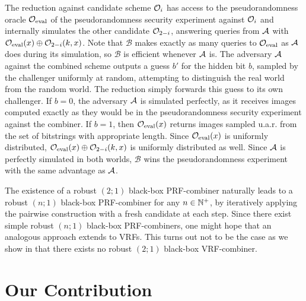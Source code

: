 The reduction against candidate scheme $\mathcal{O}_i$ has access to the pseudorandomness oracle 
$\mathcal{O}_{\text{eval}}$ of the pseudorandomness security experiment against $\mathcal{O}_i$ and internally simulates the 
other candidate $\mathcal{O}_{2-i}$, answering queries from $\mathcal{A}$ with $\mathcal{O}_{\text{eval}}(x) \oplus \mathcal{O}_{2-i}(k,x)$.
Note that $\mathcal B$ makes exactly as many queries to $\mathcal{O}_{\text{eval}}$ as $\mathcal{A}$ does during its simulation, 
so $\mathcal B$ is efficient whenever $\mathcal{A}$ is.
The adversary $\mathcal{A}$ against the combined scheme outputs a guess $b'$ for the hidden bit $b$, sampled by the challenger uniformly at random, attempting to distinguish 
the real world from the random world. The reduction simply forwards this guess to its own challenger.
If $b = 0$, the adversary $\mathcal{A}$ is simulated perfectly, as it receives images computed exactly as they would be in the
pseudorandomness security experiment against the combiner. If $b = 1$, then $\mathcal{O}_{\text{eval}}(x)$ returns images sampled u.a.r.
from the set of bitstrings with appropriate length. Since $\mathcal{O}_{\text{eval}}(x)$ is uniformly distributed, $\mathcal{O}_{\text{eval}}(x) \oplus \mathcal{O}_{2-i}(k,x)$
is uniformly distributed as well. Since $\mathcal{A}$ is perfectly simulated in both worlds,
$\mathcal B$ wins the pseudorandomness experiment with the same advantage as $\mathcal{A}$. 

The existence of a robust $(2;1)$ black-box PRF-combiner naturally leads to a robust $(n;1)$ black-box PRF-combiner
for any $n \in \mathbb{N}^+$, by iteratively applying the pairwise construction with a fresh candidate at each step. 
Since there exist simple robust $(n;1)$ black-box PRF-combiners, one might hope that an analogous approach extends to VRFs. This turns out 
not to be the case as we show in  that there exists no robust $(2;1)$ black-box VRF-combiner. 

\section{Our Contribution}

